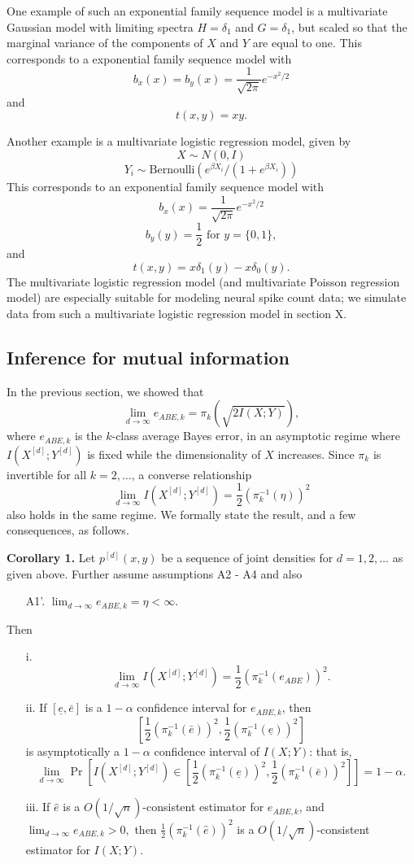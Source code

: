 \documentclass[12pt]{article}
\begin{document}
One example of such an exponential family sequence model is a
multivariate Gaussian model with limiting spectra $H = \delta_1$ and
$G = \delta_1$, but scaled so that the marginal variance of the
components of $X$ and $Y$ are equal to one.  This corresponds to a
exponential family sequence model with
\[
b_x(x) = b_y(x) = \frac{1}{\sqrt{2\pi}} e^{-x^2/2}
\]
and
\[t(x, y) = xy.\]

Another example is a multivariate logistic regression model,
given by
\[
X \sim N(0, I)
\]
\[
Y_i \sim \text{Bernoulli}(e^{\beta X_i}/(1 + e^{\beta X_i}))
\]
This corresponds to an exponential family sequence model with
\[
b_x(x) = \frac{1}{\sqrt{2\pi}} e^{-x^2/2}
\]
\[
b_y(y) = \frac{1}{2}\text{ for }y = \{0, 1\},
\]
and
\[
t(x, y) = x\delta_1(y) - x\delta_0(y).
\]
The multivariate logistic regression model (and multivariate Poisson regression model)
are especially suitable for modeling neural spike count data;
we simulate data from such a multivariate logistic regression model in section X.

\subsection{Inference for mutual information}

In the previous section, we showed that
\[
\lim_{d \to \infty} e_{ABE, k} = \pi_k(\sqrt{2 I(X; Y)}),
\]
where $e_{ABE, k}$ is the $k$-class average Bayes error,
in an asymptotic regime where $I(X^{[d]}; Y^{[d]})$ is fixed while the dimensionality of $X$ increases.
Since $\pi_k$ is invertible for all $k = 2, \hdots$,
a converse relationship
\[
\lim_{d \to \infty} I(X^{[d]}; Y^{[d]}) = \frac{1}{2}(\pi_k^{-1}(\eta))^2
\]
also holds in the same regime.  We formally state the result, and a few consequences, as follows.

\textbf{Corollary 1.}
Let $p^{[d]}(x, y)$ be a sequence of joint densities
for $d = 1,2,\hdots$ as given above.  Further assume assumptions A2 - A4 and also
\begin{itemize}
\item[A1'.] $\lim_{d \to \infty} e_{ABE, k} = \eta < \infty.$
\end{itemize}
Then
\begin{itemize}
\item[i.]
\[
\lim_{d \to \infty} I(X^{[d]}; Y^{[d]}) = \frac{1}{2}(\pi_k^{-1}(e_{ABE}))^2.
\]
\item[ii.]
If $[\underline{e}, \bar{e}]$ is a $1-\alpha$ confidence interval for $e_{ABE, k}$,
then
\[
[\frac{1}{2}(\pi_k^{-1}(\bar{e}))^2, \frac{1}{2}(\pi_k^{-1}(\underline{e}))^2]
\]
is asymptotically a $1-\alpha$ confidence interval of $I(X; Y)$: that is,
\[
\lim_{d \to \infty} \Pr\left[I(X^{[d]}; Y^{[d]}) \in [\frac{1}{2}(\pi_k^{-1}(\underline{e}))^2, \frac{1}{2}(\pi_k^{-1}(\bar{e}))^2]\right] = 1-\alpha.
\]
\item[iii.] If $\hat{e}$ is a $O(1/\sqrt{n})$-consistent estimator for $e_{ABE, k}$,
and $\lim_{d \to \infty} e_{ABE, k} > 0,$
then $\frac{1}{2}(\pi_k^{-1}(\hat{e}))^2$ is a $O(1/\sqrt{n})$-consistent estimator for $I(X; Y)$.
\end{itemize}
\end{document}

